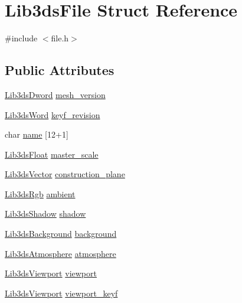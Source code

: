 \hypertarget{struct_lib3ds_file}{\section{Lib3ds\-File Struct Reference}
\label{struct_lib3ds_file}
}


{\ttfamily \#include $<$file.\-h$>$}

\subsection*{Public Attributes}
\begin{DoxyCompactItemize}
\item 
\hyperlink{types_8h_a299c9663303144c562f6bd92c2f273d3}{Lib3ds\-Dword} \hyperlink{struct_lib3ds_file_ae6e3756a3470ef9f2e7a56a43a9522e0}{mesh\-\_\-version}
\item 
\hyperlink{types_8h_a439f68d12f4ad080599044949e41dba1}{Lib3ds\-Word} \hyperlink{struct_lib3ds_file_a6fb1a681fe3ec77a7985abbf7fb633b3}{keyf\-\_\-revision}
\item 
char \hyperlink{struct_lib3ds_file_adea1e1b486823093ed1c76586b6cc0aa}{name} \mbox{[}12+1\mbox{]}
\item 
\hyperlink{types_8h_ab18e70f51f9a53c9dee8d930c8e1a7bf}{Lib3ds\-Float} \hyperlink{struct_lib3ds_file_a125d71ffa8cef3713f711c5f4fede1aa}{master\-\_\-scale}
\item 
\hyperlink{group__vector_ga6ac1c3b3ef15381ebf6baf264d658dcf}{Lib3ds\-Vector} \hyperlink{struct_lib3ds_file_a980c8806e318d5bab3e6e012471ba6a0}{construction\-\_\-plane}
\item 
\hyperlink{types_8h_a7e320d64d2488320001f7f3b25168ee3}{Lib3ds\-Rgb} \hyperlink{struct_lib3ds_file_a72cc1f3e87f252a8bdbceb9b7204ec31}{ambient}
\item 
\hyperlink{struct_lib3ds_shadow}{Lib3ds\-Shadow} \hyperlink{struct_lib3ds_file_abea0efedbe9d385f5d71a9186d6d46c6}{shadow}
\item 
\hyperlink{struct_lib3ds_background}{Lib3ds\-Background} \hyperlink{struct_lib3ds_file_a8a8e773869b9aa42d84660ed93c180ee}{background}
\item 
\hyperlink{struct_lib3ds_atmosphere}{Lib3ds\-Atmosphere} \hyperlink{struct_lib3ds_file_aff7a7078862a6dbe8d1fcdece96348c1}{atmosphere}
\item 
\hyperlink{struct_lib3ds_viewport}{Lib3ds\-Viewport} \hyperlink{struct_lib3ds_file_a60d3cef68741b6ee25e4a6e892ddedb7}{viewport}
\item 
\hyperlink{struct_lib3ds_viewport}{Lib3ds\-Viewport} \hyperlink{struct_lib3ds_file_ad8ef9da2d814e87e71a614716c2f1a27}{viewport\-\_\-keyf}

\end{DoxyCompactItemize}
